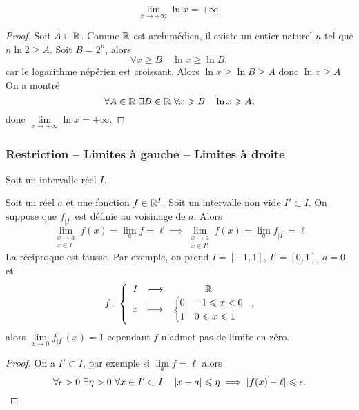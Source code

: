 \begin{theo}
  \begin{equation}
    \lim\limits_{x \to +\infty} \ln x = + \infty.
  \end{equation}
\end{theo}
\begin{proof}
  Soit \(A \in \mathbb{R}\). Comme \(\mathbb{R}\) est archimédien, il existe un entier naturel 
  \(n\) tel que \(n \ln 2 \geqslant A\). Soit \(B=2^n\), alors
  \begin{equation}
    \forall x \geqslant B \quad \ln x \geqslant \ln B,
  \end{equation}
  car le logarithme népérien est croissant. Alors \(\ln x \geqslant \ln B 
  \geqslant A\) donc \(\ln x \geqslant A\). On a montré
  \begin{equation}
    \forall A \in \mathbb{R} \ \exists B \in \mathbb{R} \ \forall x \geqslant B \quad \ln x 
    \geqslant A,
  \end{equation}
  donc \(\lim\limits_{x \to +\infty} \ln x = + \infty\).
\end{proof}

\subsubsection{Restriction -- Limites à gauche -- Limites à droite}
Soit un intervalle réel \(I\).
\begin{prop}
  Soit un réel \(a\) et une fonction \(f \in \mathbb{R}^I\). Soit un intervalle non vide 
  \(I' \subset I\). On suppose que \(f_{|I^{'}}\) est définie au voisinage de 
  \(a\). Alors
  \begin{equation}
    \lim\limits_{\begin{array}{l} x \to a \\ x \in 
      I\end{array}}f(x)=\lim\limits_{a}f=\ell \implies 
      \lim\limits_{\begin{array}{l} x \to a \\ x \in 
      I'\end{array}}f(x)=\lim\limits_{a}f_{|I^{'}}=\ell
  \end{equation}
  La réciproque est fausse. Par exemple, on prend \(I=[-1,1]\), \(I'=[0,1]\), 
  \(a=0\) et
  \begin{equation}
    \fonction{f}{I}{\R}{x}{%
      \begin{cases}
          0 & -1 \leqslant x < 0 \\
          1 & 0 \leqslant x \leqslant 1
      \end{cases}
    },
  \end{equation}
  alors \(\lim\limits_{x \to 0}f_{|I^{'}}(x)=1\) cependant \(f\) n'admet pas de 
  limite en zéro.
\end{prop}
\begin{proof}
  On a \( I' \subset I\), par exemple si \(\lim\limits_{a} f =\ell\) alors
  \begin{equation}
    \forall \epsilon > 0 \ \exists \eta > 0 \ \forall x \in I' \subset I \quad 
    \left\lvert x-a\right\rvert \leqslant \eta \implies \left\lvert f(x) - \ell\right\rvert \leqslant \epsilon.
  \end{equation}
\end{proof}


